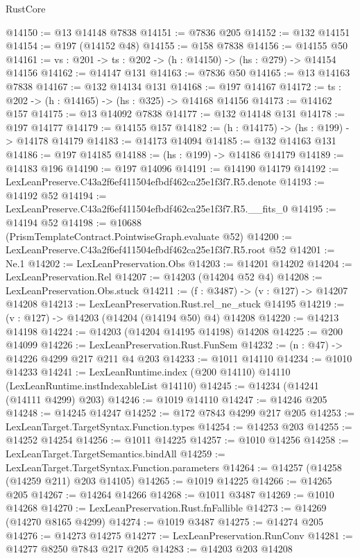 \begin{lexlean}{RustCore}
\begin{coremodule}
@14150 := @13 @14148 @7838
@14151 := @7836 @205
@14152 := @132 @14151
@14154 := @197 (@14152 @48)
@14155 := @158 @7838
@14156 := @14155 @50
@14161 := {vs : @201} -> {ts : @202} -> (h : @14150) -> (hs : @279) -> @14154 @14156
@14162 := @14147 @131
@14163 := @7836 @50
@14165 := @13 @14163 @7838
@14167 := @132 @14134 @131
@14168 := @197 @14167
@14172 := {ts : @202} -> (h : @14165) -> (hs : @325) -> @14168 @14156
@14173 := @14162 @157
@14175 := @13 @14092 @7838
@14177 := @132 @14148 @131
@14178 := @197 @14177
@14179 := @14155 @157
@14182 := (h : @14175) -> (hs : @199) -> @14178 @14179
@14183 := @14173 @14094
@14185 := @132 @14163 @131
@14186 := @197 @14185
@14188 := (hs : @199) -> @14186 @14179
@14189 := @14183 @196
@14190 := @197 @14096
@14191 := @14190 @14179
@14192 := LexLeanPreserve.C43a2f6ef411504efbdf462ca25e1f3f7.R5.denote
@14193 := @14192 @52
@14194 := LexLeanPreserve.C43a2f6ef411504efbdf462ca25e1f3f7.R5.__fits_0
@14195 := @14194 @52
@14198 := @10688 (PrismTemplateContract.PointwiseGraph.evaluate @52)
@14200 := LexLeanPreserve.C43a2f6ef411504efbdf462ca25e1f3f7.R5.root @52
@14201 := Ne.{1}
@14202 := LexLeanPreservation.Obs
@14203 := @14201 @14202
@14204 := LexLeanPreservation.Rel
@14207 := @14203 (@14204 @52 @4)
@14208 := LexLeanPreservation.Obs.stuck
@14211 := (f : @3487) -> (v : @127) -> @14207 @14208
@14213 := LexLeanPreservation.Rust.rel_ne_stuck @14195
@14219 := (v : @127) -> @14203 (@14204 (@14194 @50) @4) @14208
@14220 := @14213 @14198
@14224 := @14203 (@14204 @14195 @14198) @14208
@14225 := @200 @14099
@14226 := LexLeanPreservation.Rust.FunSem
@14232 := (n : @47) -> @14226 @4299 @217 @211 @4 @203
@14233 := @1011 @14110
@14234 := @1010 @14233
@14241 := LexLeanRuntime.index (@200 @14110) @14110 (LexLeanRuntime.instIndexableList @14110)
@14245 := @14234 (@14241 (@14111 @4299) @203)
@14246 := @1019 @14110
@14247 := @14246 @205
@14248 := @14245 @14247
@14252 := @172 @7843 @4299 @217 @205
@14253 := LexLeanTarget.TargetSyntax.Function.types
@14254 := @14253 @203
@14255 := @14252 @14254
@14256 := @1011 @14225
@14257 := @1010 @14256
@14258 := LexLeanTarget.TargetSemantics.bindAll
@14259 := LexLeanTarget.TargetSyntax.Function.parameters
@14264 := @14257 (@14258 (@14259 @211) @203 @14105)
@14265 := @1019 @14225
@14266 := @14265 @205
@14267 := @14264 @14266
@14268 := @1011 @3487
@14269 := @1010 @14268
@14270 := LexLeanPreservation.Rust.fnFallible
@14273 := @14269 (@14270 @8165 @4299)
@14274 := @1019 @3487
@14275 := @14274 @205
@14276 := @14273 @14275
@14277 := LexLeanPreservation.RunConv
@14281 := @14277 @8250 @7843 @217 @205
@14283 := @14203 @203 @14208

\end{coremodule}
\end{lexlean}
